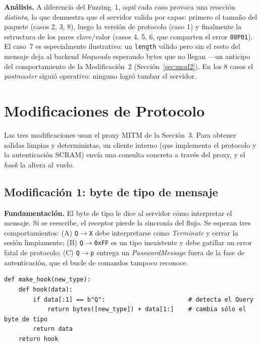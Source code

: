 \documentclass[11pt]{article}
\begin{document}
\textbf{Análisis.} A diferencia del Fuzzing~1, aquí cada caso provoca una
reacción \emph{distinta}, lo que demuestra que el servidor valida por capas:
primero el tamaño del paquete (casos 2, 3, 8), luego la versión de protocolo
(caso 1) y finalmente la estructura de los pares clave/valor (casos 4, 5, 6,
que comparten el error \texttt{08P01}). El caso~7 es especialmente
ilustrativo: un \texttt{length} válido pero sin el resto del mensaje deja al
backend \emph{bloqueado} esperando bytes que no llegan ---un anticipo del
comportamiento de la Modificación~2 (Sección~\ref{sec:mod2}). En los 8 casos el
\emph{postmaster} siguió operativo: ninguno logró tumbar el servidor.

\section{Modificaciones de Protocolo}
\label{sec:mods}

Las tres modificaciones usan el proxy MITM de la Sección~3. Para obtener salidas
limpias y deterministas, un cliente interno (que implementa el protocolo y la
autenticación SCRAM) envía una consulta concreta a través del proxy, y el
\emph{hook} la altera al vuelo.

\subsection{Modificación 1: byte de tipo de mensaje}
\label{sec:mod1}
\textbf{Fundamentación.} El byte de tipo le dice al servidor cómo interpretar el
mensaje. Si se reescribe, el receptor pierde la sincronía del flujo. Se esperan
tres comportamientos: (A) \texttt{Q}$\to$\texttt{X} debe interpretarse como
\emph{Terminate} y cerrar la sesión limpiamente; (B) \texttt{Q}$\to$\texttt{0xFF}
es un tipo inexistente y debe gatillar un error fatal de protocolo; (C)
\texttt{Q}$\to$\texttt{p} entrega un \emph{PasswordMessage} fuera de la fase de
autenticación, que el bucle de comandos tampoco reconoce.

\begin{lstlisting}[style=python, caption={Hook que reescribe el byte de tipo (\texttt{mod\_1\_message\_type.py}).}]
def make_hook(new_type):
    def hook(data):
        if data[:1] == b"Q":                       # detecta el Query
            return bytes([new_type]) + data[1:]    # cambia sólo el byte de tipo
        return data
    return hook
\end{lstlisting}
\end{document}

